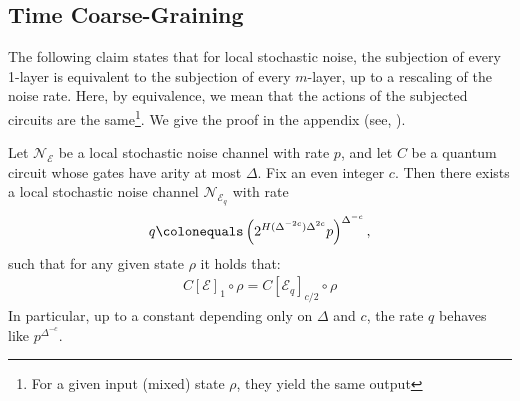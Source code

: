 \documentclass[manuscript,screen,review]{acmart}
\begin{document}
%
\tableofcontents
\newpage
%

 


\subsection{Time Coarse-Graining}



The following claim states that for local stochastic noise, the subjection of every 1-layer is equivalent to the subjection of every $m$-layer, up to a rescaling of the noise rate. Here, by equivalence, we mean that the actions of the subjected circuits are the same\footnote{For a given input (mixed) state $\rho$, they yield the same output}. We give the proof in the appendix (see, ). 
\begin{claim}
  \label{claim:block_noise_renorm}
  Let $\mathcal{N}_{\mathcal{E}}$ be a local stochastic noise channel with rate $p$, and let $C$ be a quantum circuit whose gates have arity at most $\Delta$. Fix an even integer $c$. Then there exists a local stochastic noise channel $\mathcal{N}_{\mathcal{E}_{q}}$ with rate
  \begin{equation*}
    \begin{split}
      q \colonequals \left(2^{H(\Delta^{-2c})\Delta^{2c}}p\right)^{\Delta^{-c}},
    \end{split}
  \end{equation*}
  such that for any given state $\rho$ it holds that:
  \begin{equation*}
    \begin{split}
      C[\mathcal{E}]_{1} \circ \rho =  C[\mathcal{E}_{q}]_{c/2} \circ \rho
    \end{split}
  \end{equation*}
  In particular, up to a constant depending only on $\Delta$ and $c$, the rate $q$ behaves like $p^{\Delta^{-c}}$.
\end{claim}




\end{document}
